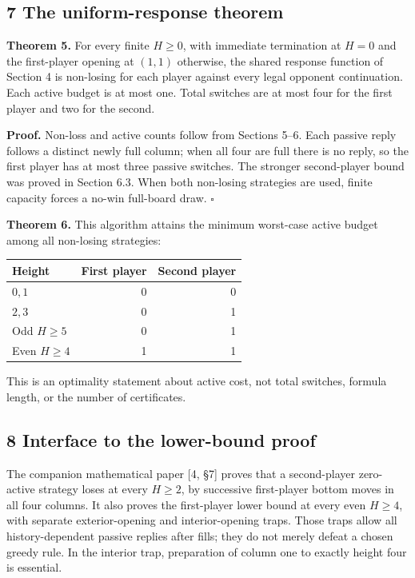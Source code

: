\documentclass[
  a4paper,
]{article}
\newcounter{none} %
\begin{document}
\subsection{7 The uniform-response
theorem}\label{the-uniform-response-theorem}

\textbf{Theorem 5.} For every finite \(H\ge0\), with immediate
termination at \(H=0\) and the first-player opening at \((1,1)\)
otherwise, the shared response function of Section 4 is non-losing for
each player against every legal opponent continuation. Each active
budget is at most one. Total switches are at most four for the first
player and two for the second.

\textbf{Proof.} Non-loss and active counts follow from Sections 5--6.
Each passive reply follows a distinct newly full column; when all four
are full there is no reply, so the first player has at most three
passive switches. The stronger second-player bound was proved in Section
6.3. When both non-losing strategies are used, finite capacity forces a
no-win full-board draw. \(\square\)

\textbf{Theorem 6.} This algorithm attains the minimum worst-case active
budget among all non-losing strategies:

{\def\LTcaptype{none} %
\begin{longtable}[]{@{}lrr@{}}
\toprule\noalign{}
Height & First player & Second player \\
\midrule\noalign{}
\endhead
\bottomrule\noalign{}
\endlastfoot
\(0,1\) & 0 & 0 \\
\(2,3\) & 0 & 1 \\
Odd \(H\ge5\) & 0 & 1 \\
Even \(H\ge4\) & 1 & 1 \\
\end{longtable}
}

This is an optimality statement about active cost, not total switches,
formula length, or the number of certificates.

\subsection{8 Interface to the lower-bound
proof}\label{interface-to-the-lower-bound-proof}

The companion mathematical paper {[}4, §7{]} proves that a second-player
zero-active strategy loses at every \(H\ge2\), by successive
first-player bottom moves in all four columns. It also proves the
first-player lower bound at every even \(H\ge4\), with separate
exterior-opening and interior-opening traps. Those traps allow all
history-dependent passive replies after fills; they do not merely defeat
a chosen greedy rule. In the interior trap, preparation of column one to
exactly height four is essential.
\end{document}
